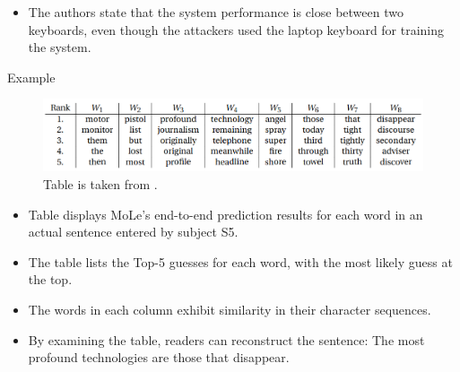\documentclass[ucs,9pt]{beamer}
\begin{document}
\begin{frame}
\begin{itemize}
	
	\item  The authors state that the system performance is close between two keyboards, even though 	the attackers used the laptop keyboard for training the system. 
	
 \end{itemize}
 \end{frame}
 


\begin{frame}{Example}
	\begin{figure}
		\centering
		\includegraphics[width=\linewidth]{imgs/sentence.png}
		\caption{Table is taken from \cite{b1}.}
	\end{figure}

\begin{itemize}
 	\item Table displays MoLe's end-to-end prediction results for each word in an actual sentence entered by subject S5. 
 	\item The table lists the Top-5 guesses for each word, with the most likely guess at the top. \item The words in each column exhibit similarity in their character sequences. 
 	\pause 
 	\item By examining the table, readers can reconstruct the sentence: \alert{The most profound technologies are those that disappear}.

\end{itemize}
\end{frame}
\end{document}
